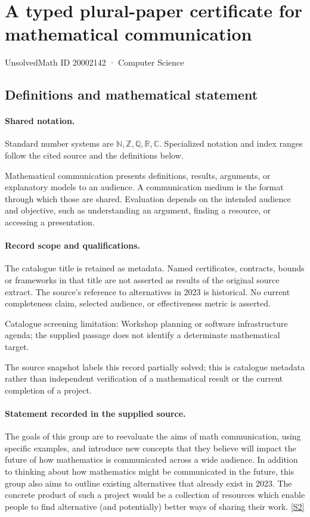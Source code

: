 \documentclass[11pt]{article}
\newcommand{\sref}[2]{\hyperlink{source:#1:#2}{[S#2]}}
\begin{document}
\setcounter{section}{20002141}
\section{A typed plural-paper certificate for mathematical communication}\label{20002142}
{\small\sffamily UnsolvedMath ID 20002142 · Computer Science}
\subsection{Definitions and mathematical statement}

\paragraph{Shared notation.}Standard number systems are $\mathbb N,\mathbb Z,\mathbb Q,\mathbb R,\mathbb C$. Specialized notation and index ranges follow the cited source and the definitions below.


Mathematical communication presents definitions, results, arguments, or explanatory models to an audience. A communication medium is the format through which those are shared. Evaluation depends on the intended audience and objective, such as understanding an argument, finding a resource, or accessing a presentation.
\paragraph{Record scope and qualifications.}
The catalogue title is retained as metadata. Named certificates, contracts, bounds or frameworks in that title are not asserted as results of the original source extract.
The source's reference to alternatives in 2023 is historical. No current completeness claim, selected audience, or effectiveness metric is asserted.

Catalogue screening limitation: Workshop planning or software infrastructure agenda; the supplied passage does not identify a determinate mathematical target.

The source snapshot labels this record partially solved; this is catalogue metadata rather than independent verification of a mathematical result or the current completion of a project.
\paragraph{Statement recorded in the supplied source.}
The goals of this group are to reevaluate the aims of math communication, using specific examples, and introduce new concepts that they believe will impact the future of how mathematics is communicated across a wide audience.
In addition to thinking about how mathematics might be communicated in the future, this group also aims to outline existing alternatives that already exist in 2023. The concrete product of such a project would be a collection of resources which enable people to find alternative (and potentially) better ways of sharing their work. \sref{20002142}{2}
\end{document}
